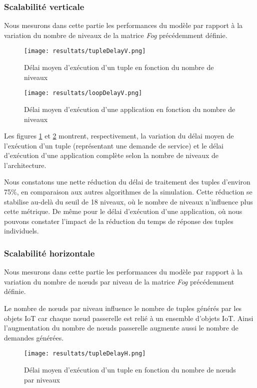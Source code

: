 \subsubsection{Scalabilité verticale}
Nous mesurons dans cette partie les performances du modèle par rapport à la variation du nombre de niveaux de la matrice \emph{Fog} précédemment définie.

\begin{figure}[H]
  \centering
  \texttt{[image: resultats/tupleDelayV.png]}
  \caption{Délai moyen d'exécution d'un tuple en fonction du nombre de niveaux}
  \label{fig:delai_tuple_vertical}
\end{figure}

\begin{figure}[H]
  \centering
  \texttt{[image: resultats/loopDelayV.png]}
  \caption{Délai moyen d'exécution d'une application en fonction du nombre de niveaux}
  \label{fig:delai_application_vertical}
\end{figure}

Les figures \ref{fig:delai_tuple_vertical} et \ref{fig:delai_application_vertical} montrent, respectivement, la variation du délai moyen de l'exécution d'un tuple (représentant une demande de service) et le délai d'exécution d'une application complète selon la nombre de niveaux de l'architecture.\par
Nous constatons une nette réduction du délai de traitement des tuples d'environ 75\%, en comparaison aux autres algorithmes de la simulation. Cette réduction se stabilise au-delà du seuil de 18 niveaux, où le nombre de niveaux n'influence plus cette métrique. De même pour le délai d'exécution d'une application, où nous pouvons constater l'impact de la réduction du temps de réponse des tuples individuels.

\subsubsection{Scalabilité horizontale}
Nous mesurons dans cette partie les performances du modèle par rapport à la variation du nombre de nœuds par niveau de la matrice \emph{Fog} précédemment définie.\par
Le nombre de nœuds par niveau influence le nombre de tuples générés par les objets IoT car chaque nœud passerelle est relié à un ensemble d’objets IoT. Ainsi l’augmentation du nombre de nœuds passerelle augmente aussi le nombre de demandes générées.

\begin{figure}[H]
  \centering
  \texttt{[image: resultats/tupleDelayH.png]}
  \caption{Délai moyen d'exécution d'un tuple en fonction du nombre de nœuds par niveaux}
  \label{fig:delai_tuple_horizontal}
\end{figure}

